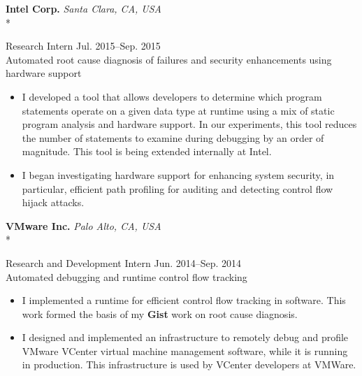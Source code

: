 \documentclass[10pt]{article}
\newcommand{\mysub}[3]{\textbf{#1} {#2} \hfill {\em #3}}
\newcommand{\myssub}[1]{%
  \par\begingroup
    \leftskip=2mm\relax
    \noindent #1\par
  \endgroup
  \vspace{1mm}%
}
\newenvironment{keepblock}{\par\Needspace{4\baselineskip}\noindent}{\par}
\begin{document}
\begin{keepblock}
\mysub{Intel Corp.}{}{Santa Clara, CA, USA} \\*
\myssub{\vspace{1mm}Research Intern \hfill Jul. 2015--Sep. 2015\\
Automated root cause diagnosis of failures and security enhancements using hardware support
\vspace{-1mm}
\begin{itemize}
\setlength\itemsep{0em}
\item{I developed a tool that allows developers to determine which program statements operate on a given data type at runtime using a mix of static program analysis and hardware support. In our experiments, this tool reduces the number of statements to examine during debugging by an order of magnitude. This tool is being extended internally at Intel.}
\item{I began investigating hardware support for enhancing system security, in particular, efficient path profiling for auditing and detecting control flow hijack attacks.}
\end{itemize}
\vspace{-2mm}
}
\end{keepblock}



\begin{keepblock}
\mysub{VMware Inc.}{}{Palo Alto, CA, USA} \\*
\myssub{\vspace{1mm}Research and Development Intern \hfill Jun. 2014--Sep. 2014\\
Automated debugging and runtime control flow tracking
\vspace{-1mm}
\begin{itemize}
\setlength\itemsep{0em}
\item{I implemented a runtime for efficient control flow tracking in software. This work formed the basis of my \textbf{Gist} work on root cause diagnosis.}
\item{I designed and implemented an infrastructure to remotely debug and profile VMware VCenter virtual machine management software, while it is running in production. This infrastructure is used by VCenter developers at VMWare.}
\end{itemize}
\vspace{-2mm}
}
\end{keepblock}
\end{document}
